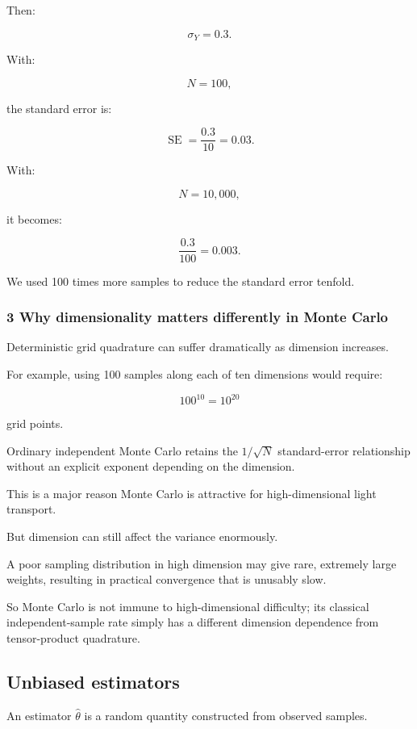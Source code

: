 Then:

\[
 \sigma_Y=0.3.
\]

With:

\[
 N=100,
\]

the standard error is:

\[
 \operatorname{SE} = \frac{0.3}{10} =\boxed{0.03}.
\]

With:

\[
 N=10{,}000,
\]

it becomes:

\[
 \frac{0.3}{100} =\boxed{0.003}.
\]

We used 100 times more samples to reduce the standard error tenfold.

\subsubsection{3 Why dimensionality matters differently in Monte Carlo}\label{02-foundations-ii-ch030-why-dimensionality-matters-differently-in-monte-carlo}

Deterministic grid quadrature can suffer dramatically as dimension increases.

For example, using 100 samples along each of ten dimensions would require:

\[
 100^{10}=10^{20}
\]

grid points.

Ordinary independent Monte Carlo retains the \(1/\sqrt N\) standard-error relationship without an explicit exponent depending on the dimension.

This is a major reason Monte Carlo is attractive for high-dimensional light transport.

But dimension can still affect the variance enormously.

A poor sampling distribution in high dimension may give rare, extremely large weights, resulting in practical convergence that is unusably slow.

So Monte Carlo is not immune to high-dimensional difficulty; its classical independent-sample rate simply has a different dimension dependence from tensor-product quadrature.

\subsection{Unbiased estimators}\label{02-foundations-ii-ch030-unbiased-estimators}

An estimator \(\widehat\theta\) is a random quantity constructed from observed samples.

